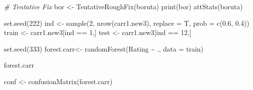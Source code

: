 \documentclass[
]{article}
\newenvironment{Shaded}{\begin{snugshade}}{\end{snugshade}}
\newcommand{\AttributeTok}[1]{\textcolor[rgb]{0.77,0.63,0.00}{#1}}
\newcommand{\CommentTok}[1]{\textcolor[rgb]{0.56,0.35,0.01}{\textit{#1}}}
\newcommand{\DecValTok}[1]{\textcolor[rgb]{0.00,0.00,0.81}{#1}}
\newcommand{\FloatTok}[1]{\textcolor[rgb]{0.00,0.00,0.81}{#1}}
\newcommand{\FunctionTok}[1]{\textcolor[rgb]{0.00,0.00,0.00}{#1}}
\newcommand{\NormalTok}[1]{#1}
\newcommand{\OtherTok}[1]{\textcolor[rgb]{0.56,0.35,0.01}{#1}}
\newcommand{\SpecialCharTok}[1]{\textcolor[rgb]{0.00,0.00,0.00}{#1}}
\begin{document}
\begin{Shaded}
\begin{Highlighting}[]
\CommentTok{\# Tentative Fix}
\NormalTok{bor }\OtherTok{\textless{}{-}} \FunctionTok{TentativeRoughFix}\NormalTok{(boruta)}
\FunctionTok{print}\NormalTok{(bor)}
\FunctionTok{attStats}\NormalTok{(boruta)}
\end{Highlighting}
\end{Shaded}

\begin{Shaded}
\begin{Highlighting}[]
\FunctionTok{set.seed}\NormalTok{(}\DecValTok{222}\NormalTok{)}
\NormalTok{ind }\OtherTok{\textless{}{-}} \FunctionTok{sample}\NormalTok{(}\DecValTok{2}\NormalTok{, }\FunctionTok{nrow}\NormalTok{(carr1.new3), }\AttributeTok{replace =}\NormalTok{ T, }\AttributeTok{prob =} \FunctionTok{c}\NormalTok{(}\FloatTok{0.6}\NormalTok{, }\FloatTok{0.4}\NormalTok{))}
\NormalTok{train }\OtherTok{\textless{}{-}}\NormalTok{ carr1.new3[ind }\SpecialCharTok{==} \DecValTok{1}\NormalTok{,]}
\NormalTok{test }\OtherTok{\textless{}{-}}\NormalTok{ carr1.new3[ind }\SpecialCharTok{==} \DecValTok{12}\NormalTok{,]}
\end{Highlighting}
\end{Shaded}

\begin{Shaded}
\begin{Highlighting}[]
\FunctionTok{set.seed}\NormalTok{(}\DecValTok{333}\NormalTok{)}
\NormalTok{forest.carr}\OtherTok{\textless{}{-}} \FunctionTok{randomForest}\NormalTok{(Rating }\SpecialCharTok{\textasciitilde{}}\NormalTok{ ., }\AttributeTok{data =}\NormalTok{ train)}

\NormalTok{forest.carr}
\end{Highlighting}
\end{Shaded}

\begin{Shaded}
\begin{Highlighting}[]
\NormalTok{conf }\OtherTok{\textless{}{-}} \FunctionTok{confusionMatrix}\NormalTok{(forest.carr)}
\end{Highlighting}
\end{Shaded}

\begin{Shaded}
\end{Shaded}
\end{document}
